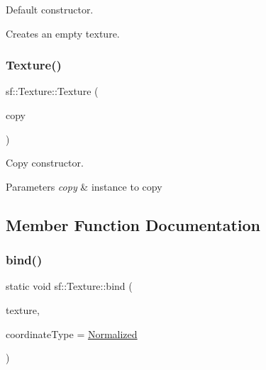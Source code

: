 Default constructor. 

Creates an empty texture. \mbox{\label{classsf_1_1_texture_a524855cbf89de3b74be84d385fd229de}} 
\subsubsection{\texorpdfstring{Texture()}{Texture()}\hspace{0.1cm}{\footnotesize\ttfamily [2/2]}}
{\footnotesize\ttfamily sf\+::\+Texture\+::\+Texture (\begin{DoxyParamCaption}\item[{const \hyperlink{classsf_1_1_texture}{Texture} \&}]{copy }\end{DoxyParamCaption})}



Copy constructor. 


\begin{DoxyParams}{Parameters}
{\em copy} & instance to copy \\
\hline
\end{DoxyParams}


\subsection{Member Function Documentation}
\mbox{\label{classsf_1_1_texture_ae9a4274e7b95ebf7244d09c7445833b0}} 
\subsubsection{\texorpdfstring{bind()}{bind()}}
{\footnotesize\ttfamily static void sf\+::\+Texture\+::bind (\begin{DoxyParamCaption}\item[{const \hyperlink{classsf_1_1_texture}{Texture} $\ast$}]{texture,  }\item[{\hyperlink{classsf_1_1_texture_aa6fd3bbe3c334b3c4428edfb2765a82e}{Coordinate\+Type}}]{coordinate\+Type = {\ttfamily \hyperlink{classsf_1_1_texture_aa6fd3bbe3c334b3c4428edfb2765a82ea69d6228950882e4d68be4ba4dbe7df73}{Normalized}} }\end{DoxyParamCaption})\hspace{0.3cm}{\ttfamily [static]}}



